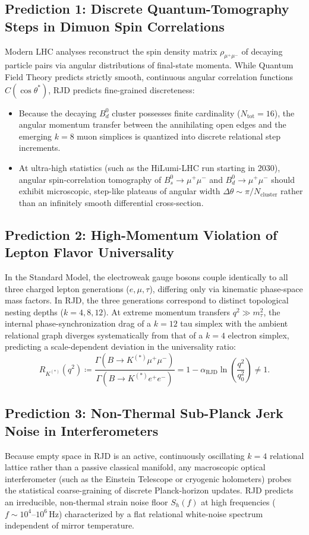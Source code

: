\documentclass[11pt,a4paper]{article}
\theoremstyle{plain}
\theoremstyle{definition}
\theoremstyle{remark}
\begin{document}
\subsection{Prediction 1: Discrete Quantum-Tomography Steps in Dimuon Spin Correlations}
Modern LHC analyses reconstruct the spin density matrix $\rho_{\mu^+\mu^-}$ of decaying particle pairs via angular distributions of final-state momenta. While Quantum Field Theory predicts strictly smooth, continuous angular correlation functions $C(\cos\theta^*)$, RJD predicts fine-grained discreteness:
\begin{itemize}
    \item Because the decaying $B_d^0$ cluster possesses finite cardinality ($N_{\mathrm{tot}} = 16$), the angular momentum transfer between the annihilating open edges and the emerging $k=8$ muon simplices is quantized into discrete relational step increments.
    \item At ultra-high statistics (such as the HiLumi-LHC run starting in 2030), angular spin-correlation tomography of $B_s^0 \to \mu^+\mu^-$ and $B_d^0 \to \mu^+\mu^-$ should exhibit microscopic, step-like plateaus of angular width $\Delta \theta \sim \pi / N_{\mathrm{cluster}}$ rather than an infinitely smooth differential cross-section.
\end{itemize}

\subsection{Prediction 2: High-Momentum Violation of Lepton Flavor Universality}
In the Standard Model, the electroweak gauge bosons couple identically to all three charged lepton generations ($e, \mu, \tau$), differing only via kinematic phase-space mass factors. In RJD, the three generations correspond to distinct topological nesting depths ($k=4, 8, 12$). At extreme momentum transfers $q^2 \gg m_\tau^2$, the internal phase-synchronization drag of a $k=12$ tau simplex with the ambient relational graph diverges systematically from that of a $k=4$ electron simplex, predicting a scale-dependent deviation in the universality ratio:
\begin{equation}
    R_{K^{(*)}}(q^2) \coloneqq \frac{\Gamma(B \to K^{(*)} \mu^+ \mu^-)}{\Gamma(B \to K^{(*)} e^+ e^-)} = 1 - \alpha_{\mathrm{RJD}} \ln\left(\frac{q^2}{q_0^2}\right) \neq 1.
\end{equation}

\subsection{Prediction 3: Non-Thermal Sub-Planck Jerk Noise in Interferometers}
Because empty space in RJD is an active, continuously oscillating $k=4$ relational lattice rather than a passive classical manifold, any macroscopic optical interferometer (such as the Einstein Telescope or cryogenic holometers) probes the statistical coarse-graining of discrete Planck-horizon updates. RJD predicts an irreducible, non-thermal strain noise floor $S_h(f)$ at high frequencies ($f \sim 10^4\text{--}10^6\,\text{Hz}$) characterized by a flat relational white-noise spectrum independent of mirror temperature.
\end{document}
